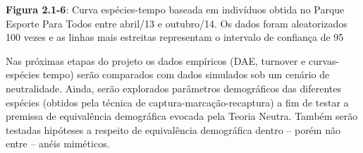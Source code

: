 \textbf{Figura 2.1-6}: Curva espécies-tempo baseada em indivíduos obtida no Parque Esporte Para Todos entre abril/13 e outubro/14. Os dados foram aleatorizados 100 vezes e as linhas mais estreitas representam o intervalo de confiança de 95%

Nas próximas etapas do projeto os dados empíricos (DAE, turnover e curvas-espécies tempo) serão comparados com dados simulados sob um cenário de neutralidade. Ainda, serão explorados parâmetros demográficos das diferentes espécies (obtidos pela técnica de captura-marcação-recaptura) a fim de testar a premissa de equivalência demográfica evocada pela Teoria Neutra. Também serão testadas hipóteses a respeito de equivalência demográfica dentro – porém não entre – anéis miméticos.